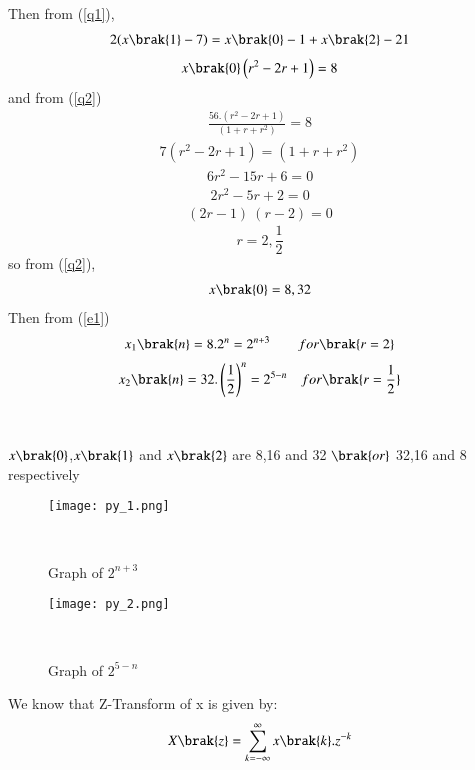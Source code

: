 \documentclass[beamer]{IEEEtran}
\theoremstyle{remark}
\begin{document}
Then from (\ref{q1}),
\begin{align}2(x\brak{1}-7)=x\brak{0}-1+x\brak{2}-21\end{align}
\begin{align}x\brak{0}\left(r^2-2r+1\right)=8\end{align}
and from (\ref{q2})
\begin{align}\frac{56.\left(r^2-2r+1\right)}{\left(1+r+r^2\right)}=8\end{align}
\begin{align}7\left(r^2-2r+1\right)=\left(1+r+r^2\right)\end{align}
\begin{align}6r^2-15r+6=0\end{align}
\begin{align}2r^2-5r+2=0\end{align}
\begin{align}(2r-1)\ (r-2)=0\end{align}
\begin{equation}
\label{q3}
r=2,\frac{1}{2}
\end{equation}
so from (\ref{q2}),
\begin{align}x\brak{0}=8,32\end{align}
Then from (\ref{e1})
\begin{align}
    \label{a11}
    x_{1}\brak{n}=8.2^{n}=2^{n+3}\qquad for \brak{r=2}
\end{align}
\begin{align}
    \label{a12}
    x_{2}\brak{n}=32.\left(\frac{1}{2}\right)^{n}=2^{5-n}\quad for \brak{r=\frac{1}{2}}
\end{align}\\\\
$x\brak{0}$,$x\brak{1}$ and $x\brak{2}$ are 8,16 and 32 $\brak{or}$ 32,16 and 8 respectively
\begin{figure}[h]
    \centering
    \texttt{[image: py\_1.png]}
    \label{fig:enter-label}
    \caption*{Graph of $2^{n+3}$ }\\
\end{figure}
\begin{figure}[h]
    \centering
    \texttt{[image: py\_2.png]}
    \caption*{Graph of $2^{5-n}$}\\
    \label{fig:enter-label}
\end{figure}
We know that Z-Transform of x is given by:
\begin{align}
\label{a13}
    X\brak{z}=\sum_{k=-\infty}^{\infty} x\brak{k}.z^{-k}
\end{align}
\end{document}
